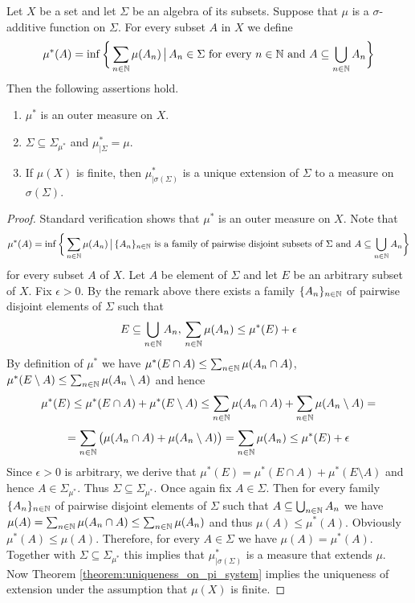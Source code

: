 \begin{theorem}\label{theorem:caratheodory_extension_result}
    Let $X$ be a set and let $\Sigma$ be an algebra of its subsets. Suppose that $\mu$ is a $\sigma$-additive function on $\Sigma$. For every subset $A$ in $X$ we define
    $$\mu^*(A) = \inf \bigg\{\sum_{n\in {\mathbb N}}\mu(A_n)\,\big|\,A_n\in \Sigma\mbox{ for every }n\in {\mathbb N}\mbox{ and }A\subseteq \bigcup_{n\in {\mathbb N}}A_n\bigg\}$$
    Then the following assertions hold.
    \begin{enumerate}[label=\emph{\textbf{(\arabic*)}}, leftmargin=*]
        \item $\mu^*$ is an outer measure on $X$.
        \item $\Sigma \subseteq \Sigma_{\mu^*}$ and $\mu^*_{\mid \Sigma} = \mu$.
        \item If $\mu(X)$ is finite, then $\mu^*_{\mid \sigma(\Sigma)}$ is a unique extension of $\Sigma$ to a measure on $\sigma(\Sigma)$.
    \end{enumerate}
\end{theorem}
\begin{proof}
    Standard verification shows that $\mu^*$ is an outer measure on $X$. Note that
    $$\mu^*(A) = \inf \bigg\{\sum_{n\in {\mathbb N}}\mu(A_n)\,\big|\,\{A_n\}_{n\in {\mathbb N}}\mbox{ is a family of pairwise disjoint subsets of }\Sigma \mbox{ and }A\subseteq \bigcup_{n\in {\mathbb N}}A_n\bigg\}$$
    for every subset $A$ of $X$. Let $A$ be element of $\Sigma$ and let $E$ be an arbitrary subset of $X$. Fix $\epsilon > 0$. By the remark above there exists a family $\{A_n\}_{n\in {\mathbb N}}$ of pairwise disjoint elements of $\Sigma$ such that
    $$E\subseteq \bigcup_{n\in {\mathbb N}}A_n,\,\sum_{n\in {\mathbb N}}\mu(A_n)\leq \mu^*(E)+\epsilon$$
    By definition of $\mu^*$ we have $\mu^*(E\cap A)\leq \sum_{n\in {\mathbb N}}\mu(A_n\cap A)$, $\mu^*(E\setminus A) \leq \sum_{n\in {\mathbb N}}\mu(A_n\setminus A)$ and hence
    $$\mu^*(E)\leq \mu^*(E\cap A)+\mu^*(E\setminus A) \leq \sum_{n\in {\mathbb N}}\mu(A_n\cap A)+\sum_{n\in {\mathbb N}}\mu(A_n\setminus A)=$$
    $$=\sum_{n\in {\mathbb N}}\big(\mu(A_n\cap A)+\mu(A_n\setminus A)\big)=\sum_{n\in {\mathbb N}}\mu(A_n)\leq \mu^*(E)+\epsilon$$
    Since $\epsilon > 0$ is arbitrary, we derive that $\mu^*(E) = \mu^*(E\cap A)+\mu^*(E\setminus A)$ and hence $A\in \Sigma_{\mu^*}$. Thus $\Sigma \subseteq \Sigma_{\mu^*}$. Once again fix $A\in \Sigma$. Then for every family $\{A_n\}_{n\in {\mathbb N}}$ of pairwise disjoint elements of $\Sigma$ such that $A\subseteq \bigcup_{n\in {\mathbb N}}A_n$ we have $\mu(A) = \sum_{n\in {\mathbb N}}\mu(A_n\cap A)\leq \sum_{n\in {\mathbb N}}\mu(A_n)$ and thus $\mu(A)\leq \mu^*(A)$. Obviously $\mu^*(A)\leq \mu(A)$. Therefore, for every $A\in \Sigma$ we have $\mu(A) = \mu^*(A)$. Together with $\Sigma\subseteq \Sigma_{\mu^*}$ this implies that $\mu^*_{\mid \sigma(\Sigma)}$ is a measure that extends $\mu$. Now Theorem \ref{theorem:uniqueness_on_pi_system} implies the uniqueness of extension under the assumption that $\mu(X)$ is finite.
\end{proof}

